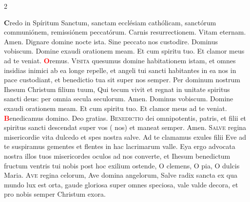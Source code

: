 \begin{multicols}{2}
\par {\bfseries \color{Red} C}redo in Spíritum Sanctum, sanctam ecclésiam cathólicam, sanctórum communiónem, remissiónem peccatórum.
\aftergroup\clearparshape%
\endgroup
\newline {} Carnis resurrectionem. \R Vitam eternam. Amen.
\newline \V Dignare domine nocte ista. \R Sine peccato nos custodire.
\newline Dominus vobiscum.  Domine exaudi orationem meam.
\newline \R Et cum spiritu tuo.  Et clamor meus ad te veniat.
\newline \textcolor{Red}{\bfseries O}remus. 
\lettrine[lines=2]{\zallmancaps \color{Blue} V}{isita} \hypertarget{visita-quesumus}{quesumus} domine habitationem istam, et omnes insidias inimici ab ea longe repelle, et angeli tui sancti habitantes in ea nos in pace custodiant, et benedictio tua sit super nos semper. Per dominum nostrum Ihesum Christum filium tuum, Qui tecum vivit et regnat in unitate spiritus sancti deus: per omnia secula seculorum. \R Amen.
\newline {} Dominus vobiscum.  Domine exaudi orationem meam.
\newline \R Et cum spiritu tuo.  Et clamor meus ad te veniat.
\newline \textcolor{Red}{\bfseries B}enedicamus domino. \R Deo gratias.
\newline {}
\lettrine[lines=2]{\zallmancaps \color{Red} B}{enedictio} dei omnipotentis, patris, et filii et spiritus sancti descendat super vos ( nos) et maneat semper. Amen.
\newline {}
\newline {}
\lettrine[lines=2]{\zallmancaps \color{Red} S}{alve} regina misericordie vita dulcedo et spes nostra salve. Ad te clamamus exules filii Eve ad te suspiramus gementes et flentes in hac lacrimarum valle. Eya ergo advocata nostra illos tuos misericordes oculos ad nos converte, et Ihesum benedictum fructum ventris tui nobis post hoc exilium ostende, O clemens, O pia, O dulcis Maria.
\newline {}
\lettrine[lines=2]{\zallmancaps \color{Blue} A}{ve} regina celorum, Ave domina angelorum, Salve radix sancta ex qua mundo lux est orta, gaude gloriosa super omnes speciosa, vale valde decora, et pro nobis semper Christum exora.

\end{multicols}
